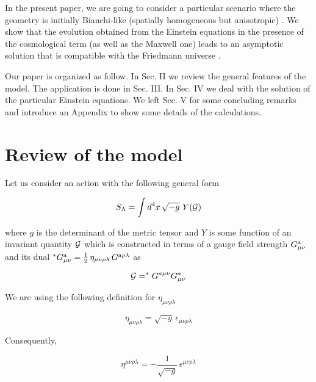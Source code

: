 \documentclass[a4paper,twocolumn,prd,superscriptaddress,nofootinbib,showpacs]
{revtex4}
\begin{document}
\medskip
In the present paper, we are going to consider a particular scenario
where the geometry is initially Bianchi-like (spatially homogeneous
but anisotropic) \cite{Belinsky}. We show that the evolution obtained
from the Einstein equations in the presence of the cosmological term
(as well as the Maxwell one) leads to an asymptotic solution that is
compatible with the Friedmann universe \cite{Weinberg,Novello2}.

\medskip
Our paper is organized as follow. In Sec. II we review the general
features of the model. The application is done in Sec. III. In Sec. IV
we deal with the solution of the particular Einstein equations. We
left Sec. V for some concluding remarks and introduce an Appendix to
show some details of the calculations.

\section{Review of the model}
\renewcommand{\theequation}{2.\arabic{equation}}
\setcounter{equation}{0}

Let us consider an action with the following general form
\cite{Novello}

\begin{equation}
S_\Lambda=\int d^4x\,\sqrt{-g}\,\,Y(\cal G)
\label{2.1}
\end{equation}

\noindent
where $g$ is the determinant of the metric tensor and $Y$ is some
function of an invariant quantity $\cal G$ which is constructed in
terms of a gauge field strength $G_{\mu\nu}^{\rm a}$  and its dual
$^\ast G_{\mu\nu}^{\rm a}=\frac{1}{2}\,\eta_{\mu\nu\rho\lambda}
\,G^{{\rm a}\rho\lambda}$ as

\begin{equation}
{\cal G}=^\ast G^{a\mu\nu}G^a_{\mu\nu}
\label{2.1a}
\end{equation}

\noindent
We are using the following definition for $\eta_{\mu\nu\rho\lambda}$

\begin{equation}
\eta_{\mu\nu\rho\lambda}=\sqrt{-g}\,\epsilon_{\mu\nu\rho\lambda}
\label{2.2}
\end{equation}

\noindent
Consequently,

\begin{equation}
\eta^{\mu\nu\rho\lambda}=-\frac{1}{\sqrt{-g}}
\,\epsilon^{\mu\nu\rho\lambda}
\label{2.3}
\end{equation}
\end{document}
